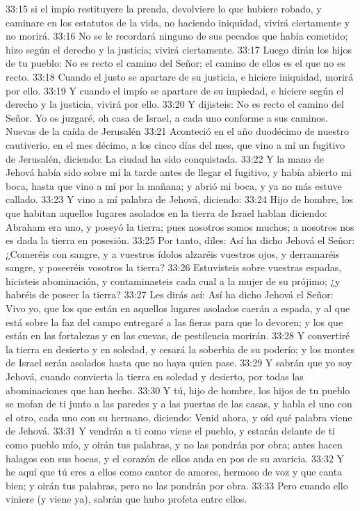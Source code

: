 33:15 si el impío restituyere la prenda, devolviere lo que hubiere robado, y caminare en los estatutos de la vida, no haciendo iniquidad, vivirá ciertamente y no morirá.   
33:16 No se le recordará ninguno de sus pecados que había cometido; hizo según el derecho y la justicia; vivirá ciertamente.   
33:17 Luego dirán los hijos de tu pueblo: No es recto el camino del Señor; el camino de ellos es el que no es recto.   
33:18 Cuando el justo se apartare de su justicia, e hiciere iniquidad, morirá por ello.   
33:19 Y cuando el impío se apartare de su impiedad, e hiciere según el derecho y la justicia, vivirá por ello.   
33:20 Y dijisteis: No es recto el camino del Señor. Yo os juzgaré, oh casa de Israel, a cada uno conforme a sus caminos.   
Nuevas de la caída de Jerusalén   
33:21 Aconteció en el año duodécimo de nuestro cautiverio, en el mes décimo, a los cinco días del mes, que vino a mí un fugitivo de Jerusalén, diciendo: La ciudad ha sido conquistada. 
33:22 Y la mano de Jehová había sido sobre mí la tarde antes de llegar el fugitivo, y había abierto mi boca, hasta que vino a mí por la mañana; y abrió mi boca, y ya no más estuve callado.   
33:23 Y vino a mí palabra de Jehová, diciendo:   
33:24 Hijo de hombre, los que habitan aquellos lugares asolados en la tierra de Israel hablan diciendo: Abraham era uno, y poseyó la tierra; pues nosotros somos muchos; a nosotros nos es dada la tierra en posesión.   
33:25 Por tanto, diles: Así ha dicho Jehová el Señor: ¿Comeréis con sangre, y a vuestros ídolos alzaréis vuestros ojos, y derramaréis sangre, y poseeréis vosotros la tierra?   
33:26 Estuvisteis sobre vuestras espadas, hicisteis abominación, y contaminasteis cada cual a la mujer de su prójimo; ¿y habréis de poseer la tierra?   
33:27 Les dirás así: Así ha dicho Jehová el Señor: Vivo yo, que los que están en aquellos lugares asolados caerán a espada, y al que está sobre la faz del campo entregaré a las fieras para que lo devoren; y los que están en las fortalezas y en las cuevas, de pestilencia morirán.   
33:28 Y convertiré la tierra en desierto y en soledad, y cesará la soberbia de su poderío; y los montes de Israel serán asolados hasta que no haya quien pase.   
33:29 Y sabrán que yo soy Jehová, cuando convierta la tierra en soledad y desierto, por todas las abominaciones que han hecho.   
33:30 Y tú, hijo de hombre, los hijos de tu pueblo se mofan de ti junto a las paredes y a las puertas de las casas, y habla el uno con el otro, cada uno con su hermano, diciendo: Venid ahora, y oíd qué palabra viene de Jehová.   
33:31 Y vendrán a ti como viene el pueblo, y estarán delante de ti como pueblo mío, y oirán tus palabras, y no las pondrán por obra; antes hacen halagos con sus bocas, y el corazón de ellos anda en pos de su avaricia.   
33:32 Y he aquí que tú eres a ellos como cantor de amores, hermoso de voz y que canta bien; y oirán tus palabras, pero no las pondrán por obra.   
33:33 Pero cuando ello viniere (y viene ya), sabrán que hubo profeta entre ellos.   
